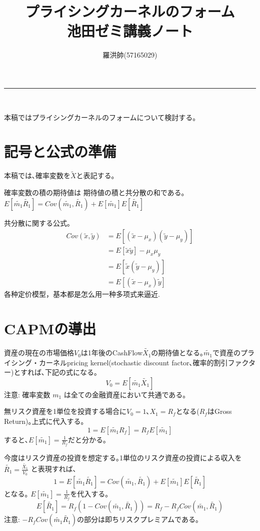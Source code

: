 \documentclass[uplatex,a4paper]{jsarticle}
\title{プライシングカーネルのフォーム \\池田ゼミ講義ノート}
\author{羅洪帥(57165029)}
\date{}
\newcommand\songti{\kanjifamily{zhsong}\selectfont}
\begin{document}
\maketitle
\hrule
\medskip　　

本稿ではプライシングカーネルのフォームについて検討する｡

\section{記号と公式の準備}
本稿では､確率変数を$\tilde{X}$と表記する｡


確率変数の積の期待値は 期待値の積と共分散の和である｡
$
E [\widetilde{m_1} \widetilde{R_1}] = Cov(\widetilde{m_1}, \widetilde{R_1}) +  E [\widetilde{m_1} ] E [ \widetilde{R_1}]
$

共分散に関する公式｡
\begin{align*}
Cov(\widetilde{x}, \widetilde{y})
& = E[(\widetilde{x} - \mu_x)(\widetilde{y} - \mu_y)]  \\
& = E[\tilde{x} \tilde{y}] - \mu_x \mu_y  \\
& = E[\tilde{x} (\tilde{y} - \mu_y  )]\\
& = E[(\tilde{x} - \mu_x  ) \tilde{y} ]
\end{align*}
{\songti 各种定价模型，基本都是怎么用一种多项式来逼近.}


\section{CAPMの導出}

資産の現在の市場価格$V_0$は1年後のCashFlow$\widetilde{X_1}$の期待値となる｡$\widetilde{m_1}$で資産のプライシング・カーネルpricing kernel(stochastic discount factor､確率的割引ファクター)とすれば､下記の式になる｡
\begin{equation*}
V_0 = E [\widetilde{m_1} \widetilde{X_1}]
\end{equation*}
注意: 確率変数 $ m_{1}$  は全ての金融資産において共通である｡

無リスク資産を1単位を投資する場合に$V_0 = 1$､$X_1 = R_f$となる($R_f$はGross Return)｡上式に代入する｡
\begin{equation*}
1 = E [\widetilde{m_1} R_f] = R_f E [\widetilde{m_1}]
\end{equation*}
すると､$\displaystyle E [\widetilde{m_1}] = \frac{1}{R_f}$だと分かる｡

今度はリスク資産の投資を想定する｡1単位のリスク資産の投資による収入を
$\displaystyle \widetilde{R_1} = \frac{\widetilde{X_1}}{V_0}$
と表現すれば､
\begin{equation*}
1 = E [\widetilde{m_1} \widetilde{R_1}] = Cov(\widetilde{m_1}, \widetilde{R_1}) +  E [\widetilde{m_1} ] E [ \widetilde{R_1}]
\end{equation*}
となる｡
$ E [\widetilde{m_1}] = \frac{1}{R_f}$を代入する｡
\begin{equation*}
E [ \widetilde{R_1}] = R_f \left ( 1- Cov(\widetilde{m_1}, \widetilde{R_1})\right ) =
R_f - R_f Cov(\widetilde{m_1}, \widetilde{R_1})
\end{equation*}
注意: $ - R_f Cov(\widetilde{m_1} \widetilde{R_1})$の部分は即ちリスクプレミアムである｡
\end{document}
